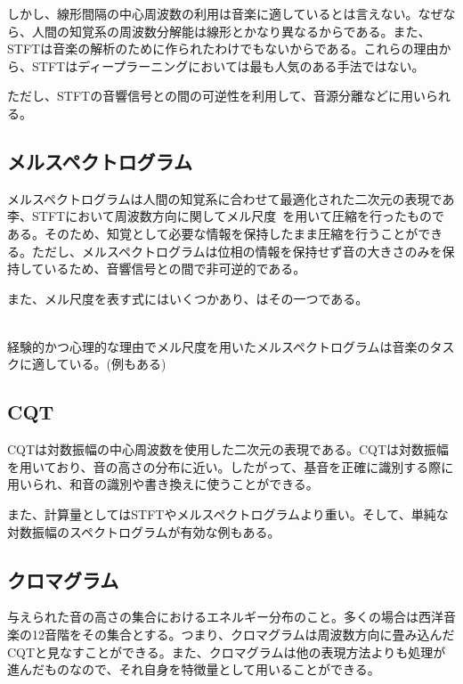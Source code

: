 しかし、線形間隔の中心周波数の利用は音楽に適しているとは言えない。なぜなら、人間の知覚系の周波数分解能は線形とかなり異なるからである。また、STFTは音楽の解析のために作られたわけでもないからである。これらの理由から、STFTはディープラーニングにおいては最も人気のある手法ではない。

ただし、STFTの音響信号との間の可逆性を利用して、音源分離などに用いられる。

\subsection{メルスペクトログラム}

メルスペクトログラムは人間の知覚系に合わせて最適化された二次元の表現であ李、STFTにおいて周波数方向に関してメル尺度~\cite{melscale}を用いて圧縮を行ったものである。そのため、知覚として必要な情報を保持したまま圧縮を行うことができる。ただし、メルスペクトログラムは位相の情報を保持せず音の大きさのみを保持しているため、音響信号との間で非可逆的である。

また、メル尺度を表す式にはいくつかあり、はその一つである。

\begin{align}
    \label{eq:mel}
\end{align}

経験的かつ心理的な理由でメル尺度を用いたメルスペクトログラムは音楽のタスクに適している。(例もある)

\subsection{CQT}

CQTは対数振幅の中心周波数を使用した二次元の表現である。CQTは対数振幅を用いており、音の高さの分布に近い。したがって、基音を正確に識別する際に用いられ、和音の識別や書き換えに使うことができる。

また、計算量としてはSTFTやメルスペクトログラムより重い。そして、単純な対数振幅のスペクトログラムが有効な例もある。

\subsection{クロマグラム}

与えられた音の高さの集合におけるエネルギー分布のこと。多くの場合は西洋音楽の12音階をその集合とする。つまり、クロマグラムは周波数方向に畳み込んだCQTと見なすことができる。また、クロマグラムは他の表現方法よりも処理が進んだものなので、それ自身を特徴量として用いることができる。